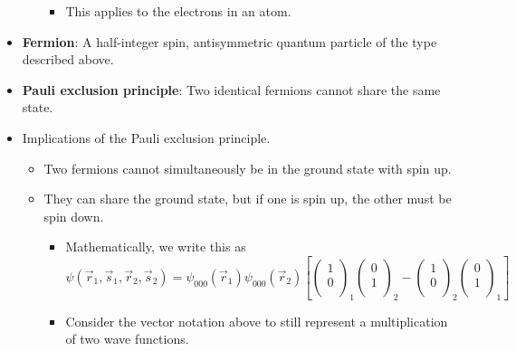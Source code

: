 \documentclass[../notes.tex]{subfiles}
\begin{document}
\begin{itemize}
\begin{itemize}
\begin{itemize}
            \item This applies to the electrons in an atom.
        \end{itemize}
    \end{itemize}
    \item \textbf{Fermion}: A half-integer spin, antisymmetric quantum particle of the type described above.
    \item \textbf{Pauli exclusion principle}: Two identical fermions cannot share the same state.
    \item Implications of the Pauli exclusion principle.
    \begin{itemize}
        \item Two fermions cannot simultaneously be in the ground state with spin up.
        \item They can share the ground state, but if one is spin up, the other must be spin down.
        \begin{itemize}
            \item Mathematically, we write this as
            \begin{equation*}
                \psi(\vec{r}_1,\vec{s}_1,\vec{r}_2,\vec{s}_2) = \psi_{000}(\vec{r}_1)\psi_{000}(\vec{r}_2)\left[
                    \begin{pmatrix}
                        1\\
                        0\\
                    \end{pmatrix}_1
                    \begin{pmatrix}
                        0\\
                        1\\
                    \end{pmatrix}_2
                    -
                    \begin{pmatrix}
                        1\\
                        0\\
                    \end{pmatrix}_2
                    \begin{pmatrix}
                        0\\
                        1\\
                    \end{pmatrix}_1
                \right]
            \end{equation*}
            \item Consider the vector notation above to still represent a multiplication of two wave functions.

\end{itemize}
\end{itemize}
\end{itemize}
\end{document}
